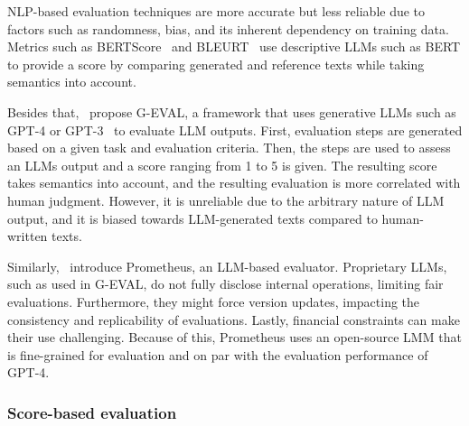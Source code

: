 NLP-based evaluation techniques are more accurate but less reliable due to factors such as randomness, bias, and its
inherent dependency on training data.
Metrics such as BERTScore\ \citep{zhang2019bertscore} and BLEURT\ \citep{sellam2020bleurt} use descriptive LLMs such as
BERT to provide a score by comparing generated and reference texts while taking semantics into account.

Besides that,\ \citet{liu2023gpteval} propose G-EVAL, a framework that uses generative LLMs such as GPT-4 or
GPT-3\ \citep{brown2020language} to evaluate LLM outputs.
First, evaluation steps are generated based on a given task and evaluation criteria.
Then, the steps are used to assess an LLMs output and a score ranging from 1 to 5 is given.
The resulting score takes semantics into account, and the resulting evaluation is more correlated with human judgment.
However, it is unreliable due to the arbitrary nature of LLM output, and it is biased towards LLM-generated texts
compared to human-written texts.

Similarly,\ \citet{kim2023prometheus} introduce Prometheus, an LLM-based evaluator.
Proprietary LLMs, such as used in G-EVAL, do not fully disclose internal operations, limiting fair evaluations.
Furthermore, they might force version updates, impacting the consistency and replicability of evaluations.
Lastly, financial constraints can make their use challenging.
Because of this, Prometheus uses an open-source LMM that is fine-grained for evaluation and on par with the evaluation
performance of GPT-4.

\subsubsection{Score-based evaluation}


